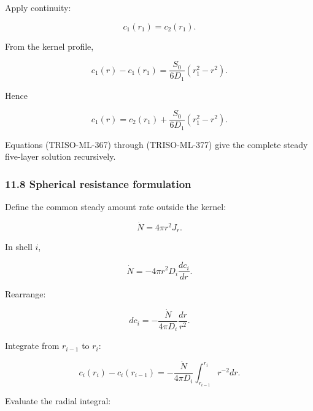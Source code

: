 \documentclass[11pt,a4paper]{article}
\begin{document}
Apply continuity:

\begin{equation}
c_1(r_1)=c_2(r_1).
\tag{TRISO-ML-375}
\label{eq:triso-ml-375}
\end{equation}

From the kernel profile,

\begin{equation}
c_1(r)-c_1(r_1)
=
\frac{S_0}{6D_1}(r_1^2-r^2).
\tag{TRISO-ML-376}
\label{eq:triso-ml-376}
\end{equation}

Hence

\begin{equation}
\boxed{
c_1(r)
=
c_2(r_1)
+
\frac{S_0}{6D_1}(r_1^2-r^2).
}
\tag{TRISO-ML-377}
\label{eq:triso-ml-377}
\end{equation}

Equations (TRISO-ML-367) through (TRISO-ML-377) give the complete steady five-layer solution recursively.

\subsubsection*{11.8 Spherical resistance formulation}

Define the common steady amount rate outside the kernel:

\begin{equation}
\dot N=4\pi r^2J_r.
\tag{TRISO-ML-378}
\label{eq:triso-ml-378}
\end{equation}

In shell $i$,

\begin{equation}
\dot N
=
-4\pi r^2D_i\frac{dc_i}{dr}.
\tag{TRISO-ML-379}
\label{eq:triso-ml-379}
\end{equation}

Rearrange:

\begin{equation}
dc_i
=
-\frac{\dot N}{4\pi D_i}\frac{dr}{r^2}.
\tag{TRISO-ML-380}
\label{eq:triso-ml-380}
\end{equation}

Integrate from $r_{i-1}$ to $r_i$:

\begin{equation}
c_i(r_i)-c_i(r_{i-1})
=
-\frac{\dot N}{4\pi D_i}
\int_{r_{i-1}}^{r_i}r^{-2}dr.
\tag{TRISO-ML-381}
\label{eq:triso-ml-381}
\end{equation}

Evaluate the radial integral:
\end{document}

